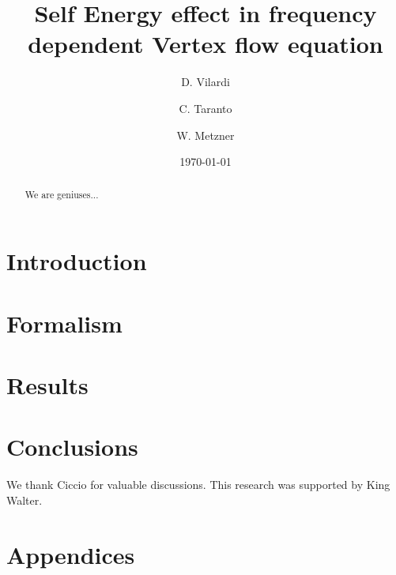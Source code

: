\documentclass[aps,prb,twocolumn,showpacs,superscriptaddress,groupedaddress]{revtex4}
\begin{document}
\title{Self Energy effect in frequency dependent Vertex flow equation}

\author {D. Vilardi}
\author{C. Taranto}
\author{W. Metzner}

\date{\today}

\begin{abstract}
We are geniuses...
\end{abstract}

\pacs{}
\maketitle

\section{Introduction}
\label{sec:introduction}


\section{Formalism}
\label{sec:formalism}


\section{Results}
\label{sec:results}


\section{Conclusions}
\label{sec:conclusions}


\begin{acknowledgments}
We thank Ciccio for valuable discussions. This research was supported by King Walter.
\end{acknowledgments}

\section{Appendices}
\label{sec:appendices}


%  
\end{document}
